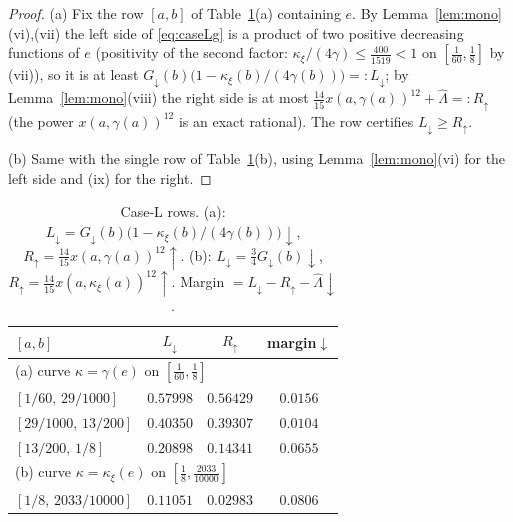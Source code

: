 \documentclass[11pt]{article}
\theoremstyle{remark}
\newcommand{\kxi}{\kappa_\xi}
\begin{document}
\begin{proof}
(a) Fix the row $[a,b]$ of Table~\ref{tab:caseL}(a) containing $e$.  By
Lemma~\ref{lem:mono}(vi),(vii) the left side of \eqref{eq:caseLg} is a
product of two positive decreasing functions of $e$ (positivity of the
second factor: $\kxi/(4\gamma)\le\tfrac{400}{1519}<1$ on
$[\tfrac1{60},\tfrac18]$ by (vii)), so it is at least
$G_\downarrow(b)\bigl(1-\kxi(b)/(4\gamma(b))\bigr)=:L_\downarrow$; by
Lemma~\ref{lem:mono}(viii) the right side is at most
$\tfrac{14}{15}x(a,\gamma(a))^{12}+\widehat\Lambda=:R_\uparrow$ (the power
$x(a,\gamma(a))^{12}$ is an exact rational).  The row certifies
$L_\downarrow\ge R_\uparrow$.

(b) Same with the single row of Table~\ref{tab:caseL}(b), using
Lemma~\ref{lem:mono}(vi) for the left side and (ix) for the right.
\end{proof}

\begin{table}[h]\centering
\caption{Case-L rows.  (a): $L_\downarrow=G_\downarrow(b)\bigl(1-
\kxi(b)/(4\gamma(b))\bigr)\downarrow$,
$R_\uparrow=\tfrac{14}{15}x(a,\gamma(a))^{12}\uparrow$.
(b): $L_\downarrow=\tfrac34G_\downarrow(b)\downarrow$,
$R_\uparrow=\tfrac{14}{15}x(a,\kxi(a))^{12}\uparrow$.
Margin $=L_\downarrow-R_\uparrow-\widehat\Lambda\downarrow$.}\label{tab:caseL}
\begin{tabular}{lccc}
\toprule
$[a,b]$ & $L_\downarrow$ & $R_\uparrow$ & margin$\downarrow$\\
\midrule
\multicolumn{4}{l}{(a) curve $\kappa=\gamma(e)$ on $[\tfrac1{60},\tfrac18]$}\\
$[1/60,\,29/1000]$ & $0.57998$ & $0.56429$ & $0.0156$ \\
$[29/1000,\,13/200]$ & $0.40350$ & $0.39307$ & $0.0104$ \\
$[13/200,\,1/8]$ & $0.20898$ & $0.14341$ & $0.0655$ \\
\midrule
\multicolumn{4}{l}{(b) curve $\kappa=\kxi(e)$ on $[\tfrac18,\tfrac{2033}{10000}]$}\\
$[1/8,\,2033/10000]$ & $0.11051$ & $0.02983$ & $0.0806$ \\
\bottomrule
\end{tabular}
\end{table}
\end{document}
